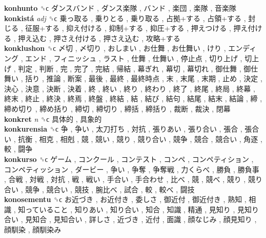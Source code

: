 \textbf{konhunto} ␝ϲ   ダンスバンド ,  ダンス楽隊 ,  バンド ,  楽団 ,  楽隊 ,  音楽隊   \\
\textbf{konkistá} \emph{adj}  ␝ϲ   乗っ取る ,  乗りとる ,  乗り取る ,  占拠+する ,  占領+する ,  封じる ,  征服+する ,  抑え付ける ,  抑制+する ,  抑圧+する ,  押えつける ,  押え付ける ,  押え込む ,  押さえ付ける ,  押さえ込む ,  攻略+する   \\
\textbf{konklushon} ␝ϲ   〆切 ,  〆切り ,  おしまい ,  お仕舞 ,  お仕舞い ,  けり ,  エンディング ,  エンド ,  フィニッシュ ,  ラスト ,  仕舞 ,  仕舞い ,  停止点 ,  切り上げ ,  切上げ ,  判定 ,  判断 ,  完 ,  完了 ,  完結 ,  帰結 ,  幕ぎれ ,  幕切 ,  幕切れ ,  御仕舞 ,  御仕舞い ,  括り ,  推論 ,  断案 ,  最後 ,  最終 ,  最終時点 ,  末 ,  末尾 ,  末期 ,  止め ,  決定 ,  決心 ,  決意 ,  決断 ,  決着 ,  終 ,  終い ,  終り ,  終わり ,  終了 ,  終尾 ,  終局 ,  終幕 ,  終末 ,  終止 ,  終決 ,  終焉 ,  終盤 ,  終結 ,  結 ,  結び ,  結句 ,  結尾 ,  結末 ,  結論 ,  締 ,  締め切り ,  締め括り ,  締切 ,  締切り ,  締括 ,  締括り ,  裁断 ,  裁決 ,  閉幕   \\
\textbf{konkret} \emph{n}  ␝ϲ   具体的 ,  具象的   \\
\textbf{konkurensia} ␝ϲ   争 ,  争い ,  太刀打ち ,  対抗 ,  張りあい ,  張り合い ,  張合 ,  張合い ,  抗衡 ,  相克 ,  相剋 ,  競 ,  競い ,  競り ,  競り合い ,  競争 ,  競合 ,  競合い ,  角逐 ,  較 ,  闘争   \\
\textbf{konkurso} ␝ϲ   ゲーム ,  コンクール ,  コンテスト ,  コンペ ,  コンペティション ,  コンペティッション ,  ダービー ,  争い ,  争奪 ,  争奪戦 ,  力くらべ ,  勝負 ,  勝負事 ,  合戦 ,  対戦 ,  対抗 ,  戦 ,  戦い ,  手合い ,  手合わせ ,  比べ ,  競 ,  競べ ,  競り ,  競り合い ,  競争 ,  競合い ,  競技 ,  腕比べ ,  試合 ,  較 ,  較べ ,  闘技   \\
\textbf{konosementu} ␝ϲ   お近づき ,  お近付き ,  委しさ ,  御近付 ,  御近付き ,  熟知 ,  相識 ,  知っていること ,  知りあい ,  知り合い ,  知合 ,  知識 ,  精通 ,  見知り ,  見知り合い ,  見知合 ,  見知合い ,  詳しさ ,  近づき ,  近付 ,  面識 ,  顔なじみ ,  顔見知り ,  顔馴染 ,  顔馴染み   \\
